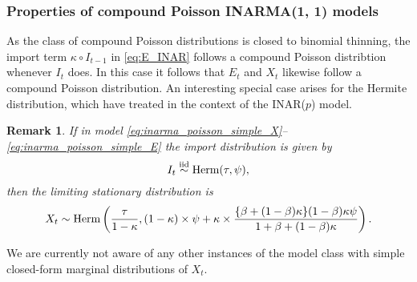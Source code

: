 \documentclass{article}
\newtheorem{remark}{Remark}
\begin{document}
\subsubsection{Properties of compound Poisson INARMA(1, 1) models}

As the class of compound Poisson distributions is closed to binomial thinning, the import term $\kappa \circ I_{t - 1}$ in \eqref{eq:E_INAR} follows a compound Poisson distribtion whenever $I_t$ does. In this case it follows that $E_t$ and $X_t$ likewise follow a compound Poisson distribution. An interesting special case arises for the Hermite distribution, which \cite{Fernandez-Fontelo2017} have treated in the context of the INAR($p$) model. %

\begin{remark}
If in model \eqref{eq:inarma_poisson_simple_X}--\eqref{eq:inarma_poisson_simple_E} the import distribution is given by
$$
I_t \stackrel{\textnormal{iid}}{\sim} \textnormal{Herm}(\tau, \psi),
$$
then the limiting stationary distribution is
$$
X_t \sim \textnormal{Herm}\left(\frac{\tau}{1 - \kappa},
(1 - \kappa)\times\psi + \kappa\times\frac{\{\beta + (1 - \beta)\kappa\}(1 - \beta)\kappa\psi}{1 + \beta + (1 - \beta)\kappa}
  \right).
$$
\end{remark}
We are currently not aware of any other instances of the model class with simple closed-form marginal distributions of $X_t$.
\end{document}
